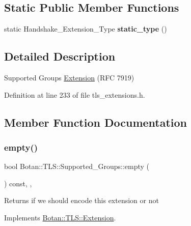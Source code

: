 \subsection*{Static Public Member Functions}
\begin{DoxyCompactItemize}
\item 
\mbox{\label{class_botan_1_1_t_l_s_1_1_supported___groups_a84950f5dc55309ab663bee79c4eb5702}} 
static Handshake\+\_\+\+Extension\+\_\+\+Type {\bfseries static\+\_\+type} ()
\end{DoxyCompactItemize}


\subsection{Detailed Description}
Supported Groups \mbox{\hyperlink{class_botan_1_1_t_l_s_1_1_extension}{Extension}} (R\+FC 7919) 

Definition at line 233 of file tls\+\_\+extensions.\+h.



\subsection{Member Function Documentation}
\mbox{\label{class_botan_1_1_t_l_s_1_1_supported___groups_a00ea6c535e6d7198cf6b74c1fb4fe71a}} 
\subsubsection{\texorpdfstring{empty()}{empty()}}
{\footnotesize\ttfamily bool Botan\+::\+T\+L\+S\+::\+Supported\+\_\+\+Groups\+::empty (\begin{DoxyParamCaption}{ }\end{DoxyParamCaption}) const\hspace{0.3cm}{\ttfamily [inline]}, {\ttfamily [override]}, {\ttfamily [virtual]}}

\begin{DoxyReturn}{Returns}
if we should encode this extension or not 
\end{DoxyReturn}


Implements \mbox{\hyperlink{class_botan_1_1_t_l_s_1_1_extension_aa850b9be2322f94e7c65e583cd51acc5}{Botan\+::\+T\+L\+S\+::\+Extension}}.



